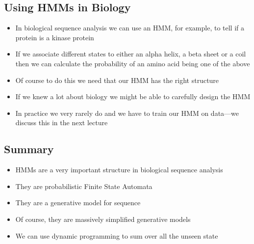 \begin{slide}
\section[-1]{Using HMMs in Biology}

\begin{PauseHighLight}
  \begin{itemize}
  \item In biological sequence analysis we can use an HMM, for example,
    to tell if a protein is a kinase protein\pause
  \item If we associate different states to either an alpha helix, a beta
    sheet or a coil then we can calculate the probability of an amino acid
    being one of the above\pause
  \item Of course to do this we need that our HMM has the right
    structure\pause
  \item If we knew a lot about biology we might be able to carefully
    design the HMM\pause
  \item In practice we very rarely do and we have to train our HMM on
    data\pause---we discuss this in the next lecture\pause
  \end{itemize}
\end{PauseHighLight}

\end{slide}


\begin{slide}
\section{Summary}

\begin{PauseHighLight}
  \begin{itemize}
  \item HMMs are a very important structure in biological sequence
    analysis\pause
  \item They are probabilistic Finite State Automata\pause
  \item They are a generative model for sequence\pause
  \item Of course, they are massively simplified generative models\pause
  \item We can use dynamic programming to sum over all the unseen state\pause
  \end{itemize}
\end{PauseHighLight}

\end{slide}

